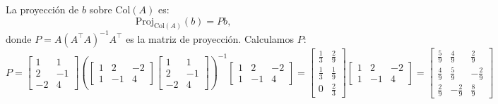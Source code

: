 \begin{enumerate}[label=\color{red}\textbf{\arabic*)}]
\begin{enumerate}[label=Paso \arabic*:]
    La proyección de $b$ sobre  $\mathrm{Col}(A)$ es: \[
    \mathrm{Proj}_{\mathrm{Col}(A)}(b)=Pb,
    \] 
    donde $P=A(A^\intercal A)^{-1} A^\intercal$ es la matriz de proyección. Calculamos $P$:  \[
    P=\begin{bmatrix}
1 & 1 \\ 2 & -1 \\ -2 & 4  
    \end{bmatrix} \left( \begin{bmatrix} 
        1 & 2 & -2\\
        1 & -1 & 4
    \end{bmatrix} \begin{bmatrix} 
        1 & 1\\ 2 & -1\\ -2 & 4 
    \end{bmatrix}  \right)^{-1} \begin{bmatrix} 
        1 & 2 & -2\\
        1 & -1 & 4
    \end{bmatrix} =\begin{bmatrix} 
        \frac{1}{3} & \frac{2}{9} \\
        \frac{1}{3} & \frac{1}{9} \\
        0 & \frac{2}{3} 
    \end{bmatrix} \begin{bmatrix} 
        1 & 2 & -2\\
        1 & -1 & 4
    \end{bmatrix} =\begin{bmatrix} 
        \frac{5}{9} & \frac{4}{9} & \frac{2}{9} \\
        \frac{4}{9} & \frac{5}{9} & -\frac{2}{9} \\
        \frac{2}{9} & -\frac{2}{9} & \frac{8}{9} 
    \end{bmatrix} 
    \] 


\end{enumerate}
\end{enumerate}
